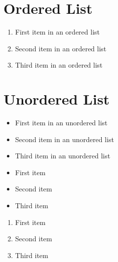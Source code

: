 \documentclass{article}
\begin{document}
\section{Ordered List}

\begin{enumerate}
    \item First item in an ordered list
    \item Second item in an ordered list
    \item Third item in an ordered list
\end{enumerate}

\section{Unordered List}

\begin{itemize}
    \item First item in an unordered list
    \item Second item in an unordered list
    \item Third item in an unordered list
\end{itemize}


\begin{itemize}
    \renewcommand{\labelitemi}{--}
    \item First item
    \item Second item
    \item Third item
\end{itemize}


\begin{enumerate}
    \renewcommand{\labelenumi}{\Alph{enumi}.}
    \item First item
    \item Second item
    \item Third item
\end{enumerate}
\end{document}
